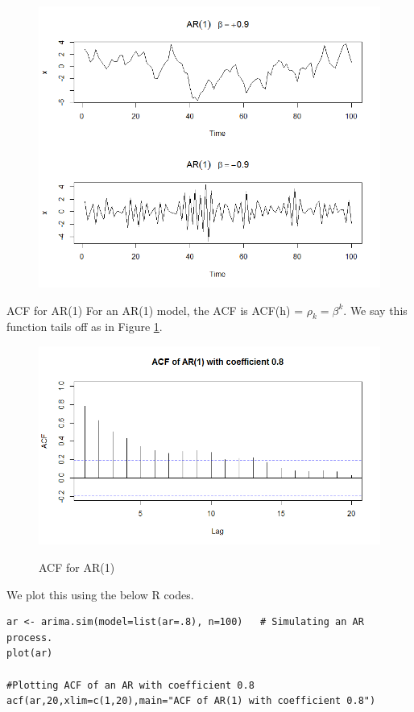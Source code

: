 \documentclass[a4paper]{article}
\theoremstyle{definition}
\begin{document}
\begin{figure}
[h]
\includegraphics[width=0.9\linewidth]{AR(1)}
\end{figure}

\begin{paragraph}{ACF for AR(1)}
For an AR(1) model, the ACF is ACF(h) = $ \rho_k = \beta^k $. We say this function tails off as in Figure \ref{ACF_ar1}.   
\end{paragraph}


\begin{figure}
[h]
\includegraphics[width=0.9\linewidth]{../Beamer/ACF_ar1}
\label{ACF_ar1}
\caption{ACF for AR(1)}
\end{figure}

We plot this using the below R codes. 

\begin{lstlisting}
ar <- arima.sim(model=list(ar=.8), n=100)   # Simulating an AR process. 
plot(ar)

#Plotting ACF of an AR with coefficient 0.8 
acf(ar,20,xlim=c(1,20),main="ACF of AR(1) with coefficient 0.8")   
\end{lstlisting}
\end{document}
